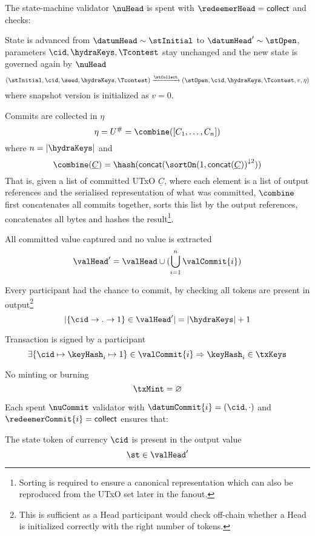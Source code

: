 \noindent The state-machine validator $\nuHead$ is spent with
$\redeemerHead = \mathsf{collect}$ and checks:
\begin{menumerate}
  \item State is advanced from $\datumHead \sim \stInitial$ to
  $\datumHead' \sim \stOpen$, parameters $\cid,\hydraKeys,\Tcontest$ stay
  unchanged and the new state is governed again by $\nuHead$
  \[
	(\stInitial,\cid,\seed,\hydraKeys,\Tcontest) \xrightarrow{\stCollect} (\stOpen,\cid,\hydraKeys,\Tcontest,v,\eta)
  \]
  where snapshot version is initialized as $v = 0$.
  \item Commits are collected in $\eta$
  \[
	\eta = U^{\#} = \combine([C_{1}, \dots, C_{n}])
  \]
  where $n = |\hydraKeys|$ and
  \[
	\combine(\underline{C}) = \hash(\mathsf{concat}({\sortOn(1, \mathsf{concat}(\underline{C}))}^{\downarrow2}))
  \]
  That is, given a list of committed UTxO $\underline{C}$, where each element is
  a list of output references and the serialised representation of what was
  committed, $\combine$ first concatenates all commits together, sorts this list
  by the output references, concatenates all bytes and hashes the
  result\footnote{Sorting is required to ensure a canonical representation which
	can also be reproduced from the UTxO set later in the fanout.}.

  \item All committed value captured and no value is extracted
  \[
	\valHead' = \valHead \cup (\bigcup_{i=1}^{n} \valCommit{i})
  \]
  \item Every participant had the chance to commit, by checking all tokens are
  present in output\footnote{This is sufficient as a Head participant would
	check off-chain whether a Head is initialized correctly with the right
	number of tokens.}
  \[
	|\{\cid \rightarrow . \rightarrow 1\} \in \valHead'| = |\hydraKeys| + 1
  \]
  \item Transaction is signed by a participant
  \[
	\exists \{\cid \mapsto \keyHash_{i} \mapsto 1\} \in \valCommit{i} \Rightarrow \keyHash_{i} \in \txKeys
  \]
  \item No minting or burning
  \[
	\txMint = \varnothing
  \]
\end{menumerate}

\noindent Each spent $\nuCommit$ validator with $\datumCommit{i} = (\cid,\cdot)$ and $\redeemerCommit{i} = \mathsf{collect}$ ensures that:
\begin{menumerate}
  \item The state token of currency $\cid$ is present in the output value
  \[
	\st \in \valHead'
  \]
\end{menumerate}

